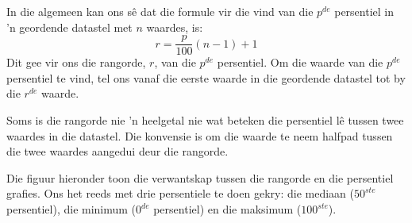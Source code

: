 In die algemeen kan ons sê dat die formule vir die vind van die $p^{de}$ persentiel in ’n geordende datastel met $n$ waardes, is: 
\begin{equation*}
  r = \frac{p}{100}\left(n-1\right)+1
\end{equation*}
Dit gee vir ons die rangorde, $r$, van die $p^{de}$ persentiel. Om die waarde van die $p^{de}$ persentiel te vind, tel ons vanaf die eerste waarde in die geordende datastel tot by die $r^{de}$ waarde.

Soms is die rangorde nie ’n heelgetal nie wat beteken die persentiel lê tussen twee waardes in die datastel. Die konvensie is om die waarde te neem halfpad tussen die twee waardes aangedui deur die rangorde.

 Die figuur hieronder toon die verwantskap tussen die rangorde en die persentiel grafies. Ons het reeds met drie persentiele te doen gekry: die mediaan ($50^{ste}$ persentiel), die minimum ($0^{de}$ persentiel) en die maksimum ($100^{ste}$).
\begin{center}
\end{center}


